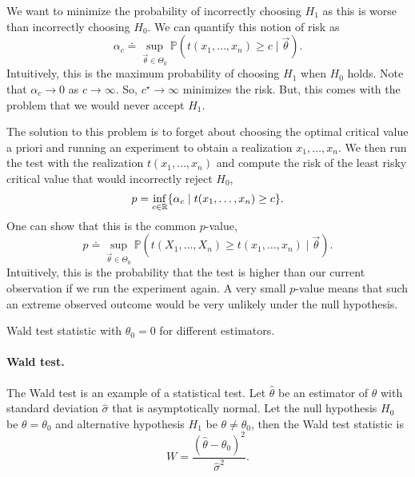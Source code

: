 We want to minimize the probability of incorrectly choosing $H_1$ as this is worse than incorrectly
choosing $H_0$. We can quantify this notion of risk as \[
    \alpha_c \doteq \sup_{\vec{\theta} \in \Theta_0} \mathbb{P}(t(x_1, \ldots, x_n) \geq c \mid \vec{\theta}).
\]
Intuitively, this is the maximum probability of choosing $H_1$ when $H_0$ holds. Note that
$\alpha_c \to 0$ as $c \to \infty$. So, $c^\star \to \infty$ minimizes the risk. But, this comes
with the problem that we would never accept $H_1$.

The solution to this problem is to forget about choosing the optimal critical value a priori and
running an experiment to obtain a realization $x_1, \ldots, x_n$. We then run the test with the
realization $t(x_1, \ldots, x_n)$ and compute the risk of the least risky critical value that would
incorrectly reject $H_0$, \[
    p = \inf_{c \in \mathbb{R}} \{ \alpha_c \mid t(x_1, \ldots, x_n) \geq c \}.
\]
One can show that this is the common $p$-value, \[
    p \doteq \sup_{\vec{\theta} \in \Theta_0} \mathbb{P}(t(X_1, \ldots, X_n) \geq t(x_1, \ldots, x_n) \mid \vec{\theta}).
\]
Intuitively, this is the probability that the test is higher than our current observation if we run
the experiment again. A very small $p$-value means that such an extreme observed outcome would be
very unlikely under the null hypothesis.

\begin{marginfigure}
    \centering
    \caption{Wald test statistic with $\theta_0 = 0$ for different estimators.}
    \label{fig:wald}
\end{marginfigure}

\paragraph{Wald test.}

The Wald test is an example of a statistical test. Let $\hat{\theta}$ be an estimator of $\theta$
with standard deviation $\hat{\sigma}$ that is asymptotically normal. Let the null hypothesis $H_0$
be $\theta = \theta_0$ and alternative hypothesis $H_1$ be $\theta \neq \theta_0$, then the Wald
test statistic is \[
    W = \frac{(\hat{\theta} - \theta_0)^2}{\hat{\sigma}^2}.
\]

